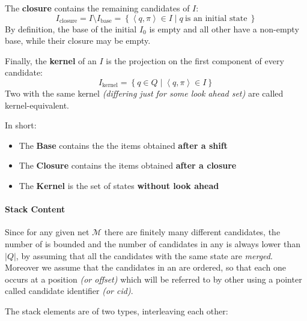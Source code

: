 \documentclass[english]{article}
\begin{document}
The \textbf{closure} contains the remaining candidates of \(I\):
\[ I_{\text{closure}} = I \setminus I_{\text{base}} = \left\{ \left\langle q , \pi \right\rangle \in I \mid q \ \text{is an initial state} \ \right\} \]
By definition, the base of the initial \mstate \(I_0\) is empty and all other \mstates have a non-empty base, while their closure may be empty.

Finally, the \textbf{kernel} of an \mstate \(I\) is the projection on the first component of every candidate:
\[ I_{\text{kernel}} = \left\{ q \in Q \mid \left\langle q, \pi \right\rangle \in I \right\} \]
Two \mstates with the same kernel \textit{(differing just for some look ahead set)} are called kernel-equivalent.

\bigskip
In short:

\begin{itemize}
  \item The \textbf{Base} contains the the items obtained \textbf{after a shift}
  \item The \textbf{Closure} contains the items obtained \textbf{after a closure}
  \item The \textbf{Kernel} is the set of states \textbf{without look ahead}
\end{itemize}

\paragraph{Stack Content}
\label{par:stack-content}

Since for any given net \(\mathcal{M}\) there are finitely many different candidates, the number of \mstates is bounded and the number of candidates in any \mstate is always lower than \(| Q |\), by assuming that all the candidates with the same state are \textit{merged}.
Moreover we assume that the candidates in an \mstate are ordered, so that each one occurs at a position \textit{(or offset)} which will be referred to by other \mstates using a pointer called candidate identifier \textit{(or cid)}.

The stack elements are of two types, interleaving each other:
\end{document}

